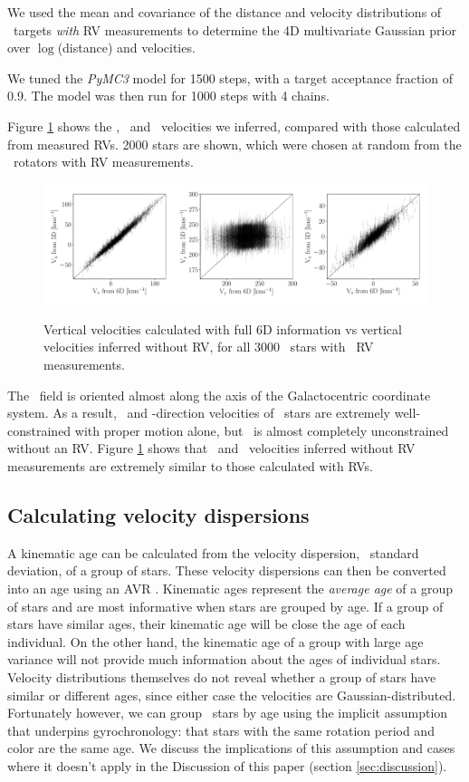 We used the mean and covariance of the distance and velocity distributions of
\kepler\ targets {\it with} RV measurements to determine the 4D multivariate
Gaussian prior over $\log$(distance) and velocities.

We tuned the {\it PyMC3} model for 1500 steps, with a target acceptance
fraction of 0.9.
The model was then run for 1000 steps with 4 chains.

Figure \ref{fig:v_comparison} shows the \vx, \vy\ and \vz\ velocities we
inferred, compared with those calculated from measured RVs.
2000 stars are shown, which were chosen at random from the \kepler\ rotators
with RV measurements.
\begin{figure}[ht!]
\caption{Vertical velocities calculated with full 6D information vs vertical
    velocities inferred without RV, for all 3000 \mct\ stars with \gaia\ RV
    measurements.}
  \centering
    \includegraphics[width=1\textwidth]{v_comparison}
\label{fig:v_comparison}
\end{figure}
The \kepler\ field is oriented almost along the \y\-axis of the Galactocentric
coordinate system.
As a result, \x\ and \z-direction velocities of \kepler\ stars are extremely
well-constrained with proper motion alone, but \vy\ is almost completely
unconstrained without an RV.
Figure \ref{fig:v_comparison} shows that \vx\ and \vz\ velocities inferred
without RV measurements are extremely similar to those calculated with RVs.

\subsection{Calculating velocity dispersions}
\label{sec:velocity_dispersion}

A kinematic age can be calculated from the velocity dispersion, \ie\ standard
deviation, of a group of stars.
These velocity dispersions can then be converted into an age using an AVR
\citep[\eg][]{holmberg2009, yu2018}.
Kinematic ages represent the {\it average age} of a group of stars and are
most informative when stars are grouped by age.
If a group of stars have similar ages, their kinematic age will be close
the age of each individual.
On the other hand, the kinematic age of a group with large age variance will
not provide much information about the ages of individual stars.
Velocity distributions themselves do not reveal whether a group of stars have
similar or different ages, since either case the velocities are
Gaussian-distributed.
Fortunately however, we can group \kepler\ stars by age using the implicit
assumption that underpins gyrochronology: that stars with the same rotation
period and color are the same age.
We discuss the implications of this assumption and cases where it doesn't
apply in the Discussion of this paper (section \ref{sec:discussion}).

